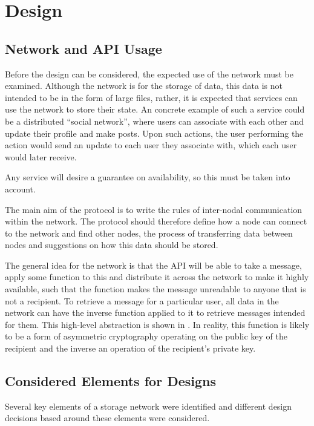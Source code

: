 \section{Design} \label{design}

	\subsection{Network and API Usage}

	Before the design can be considered, the expected use of the network must be examined. Although the network is for the storage of data, this data is not intended to be in the form of large files, rather, it is expected that services can use the network to store their state. An concrete example of such a service could be a distributed ``social network'', where users can associate with each other and update their profile and make posts. Upon such actions, the user performing the action would send an update to each user they associate with, which each user would later receive.

	Any service will desire a guarantee on availability, so this must be taken into account.

	The main aim of the protocol is to write the rules of inter-nodal communication within the network. The protocol should therefore define how a node can connect to the network and find other nodes, the process of transferring data between nodes and suggestions on how this data should be stored. 

	The general idea for the network is that the API will be able to take a message, apply some function to this and distribute it across the network to make it highly available, such that the function makes the message unreadable to anyone that is not a recipient. To retrieve a message for a particular user, all data in the network can have the inverse function applied to it to retrieve messages intended for them. This high-level abstraction is shown in . In reality, this function is likely to be a form of asymmetric cryptography operating on the public key of the recipient and the inverse an operation of the recipient's private key.
	
	\subsection{Considered Elements for Designs}
		Several key elements of a storage network were identified and different design decisions based around these elements were considered. 
		
